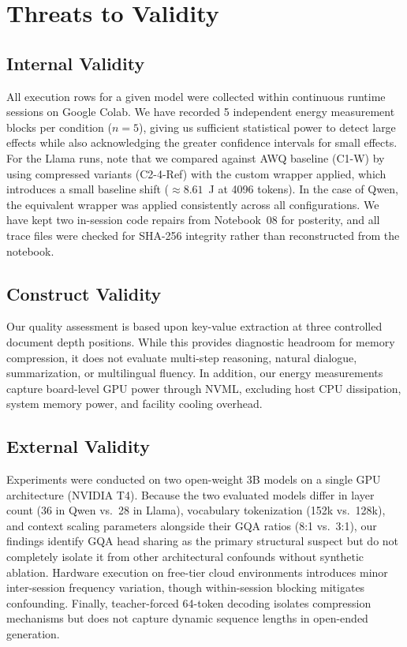 \documentclass[sigconf,nonacm]{acmart}
\begin{document}
\section{Threats to Validity}

\subsection{Internal Validity}
All execution rows for a given model were collected within continuous runtime sessions on Google Colab. We have recorded 5 independent energy measurement blocks per condition ($n=5$), giving us sufficient statistical power to detect large effects while also acknowledging the greater confidence intervals for small effects. For the Llama runs, note that we compared against AWQ baseline (C1-W) by using compressed variants (C2-4-Ref) with the custom wrapper applied, which introduces a small baseline shift ($\approx 8.61$~J at 4096 tokens). In the case of Qwen, the equivalent wrapper was applied consistently across all configurations. We have kept two in-session code repairs from Notebook~08 for posterity, and all trace files were checked for SHA-256 integrity rather than reconstructed from the notebook.

\subsection{Construct Validity}
Our quality assessment is based upon key-value extraction at three controlled document depth positions. While this provides diagnostic headroom for memory compression, it does not evaluate multi-step reasoning, natural dialogue, summarization, or multilingual fluency. In addition, our energy measurements capture board-level GPU power through NVML, excluding host CPU dissipation, system memory power, and facility cooling overhead.

\subsection{External Validity}
Experiments were conducted on two open-weight 3B models on a single GPU architecture (NVIDIA T4). Because the two evaluated models differ in layer count (36 in Qwen vs.\ 28 in Llama), vocabulary tokenization (152k vs.\ 128k), and context scaling parameters alongside their GQA ratios (8:1 vs.\ 3:1), our findings identify GQA head sharing as the primary structural suspect but do not completely isolate it from other architectural confounds without synthetic ablation. Hardware execution on free-tier cloud environments introduces minor inter-session frequency variation, though within-session blocking mitigates confounding. Finally, teacher-forced 64-token decoding isolates compression mechanisms but does not capture dynamic sequence lengths in open-ended generation.
\end{document}
